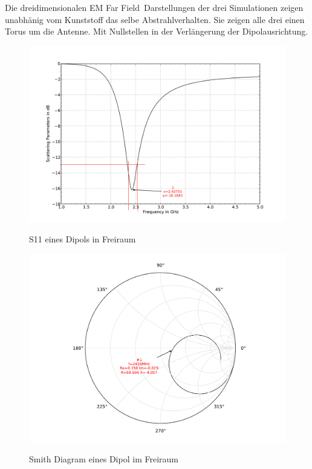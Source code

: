 Die dreidimensionalen \glqq EM Far Field\grqq \  Darstellungen der drei Simulationen zeigen unabhänig vom Kunststoff das selbe Abstrahlverhalten. Sie zeigen alle drei einen Torus um die Antenne. Mit Nullstellen in der Verlängerung der Dipolausrichtung.

\begin{figure}[!htb]
\begin{center}
  \includegraphics[width=\linewidth]{content/bilder/Evaluation/Dipol/S11DipolOhneABS.pdf}
  \caption{S11 eines Dipols in Freiraum}\label{fig:S11_Dipol_freiraum_1}
\endminipage%
{}
  \includegraphics[width=\linewidth]{content/bilder/Evaluation/Dipol/SmithDipolOhneABS.pdf}
  \caption{Smith Diagram eines Dipol im Freiraum}\label{fig:Smith_Dipol_freiraum_2}
\endminipage
\end{center}
\end{figure}

